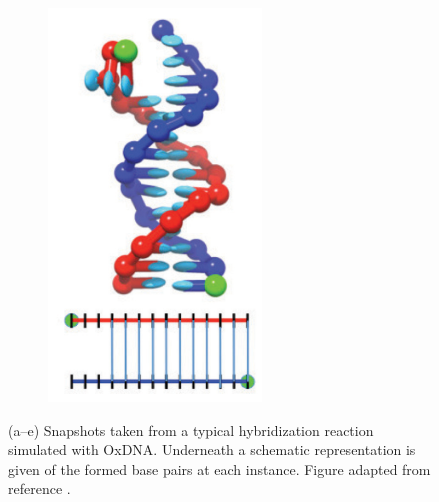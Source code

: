 \begin{figure}[ht]
\begin{centering}
\begin{subfigure}[t]{\dimexpr.2\linewidth-1.3em\relax}
  \includegraphics[width=.8\linewidth,valign=t]{Figures/hybridDiag5.png}
  \end{subfigure}
  \caption[Snapshots of DNA hybridization reaction taken from a typical
      trajectory.]{{\linespread{0.1}\small
      (a--e) Snapshots taken from a typical hybridization
      reaction simulated with OxDNA. Underneath a schematic representation is given of
  the formed base pairs at each instance. Figure adapted from reference
  \cite{Ouldridge2013}.}}
  \label{fig:hybridization}
  \end{centering}

\end{figure}

